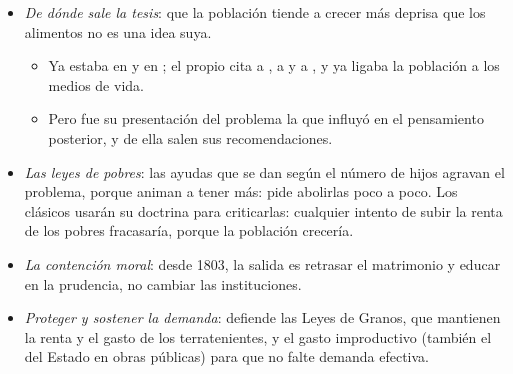 \documentclass[11pt]{article}
\begin{document}
\begin{itemize}
\item \emph{De dónde sale la tesis}: que la población tiende a crecer más deprisa que los alimentos no es una idea suya.
  \begin{itemize}
  \item Ya estaba en  y en \nocite{LandrethColander2006Historia}; el propio  cita a , a  y a \nocite{Malthus1798Essay}, y ya \textcite{Cantillon1755Essai} ligaba la población a los medios de vida.
  \item Pero fue su presentación del problema la que influyó en el pensamiento posterior, y de ella salen sus recomendaciones.
  \end{itemize}
\item \emph{Las leyes de pobres}: las ayudas que se dan según el número de hijos agravan el problema, porque animan a tener más:  pide abolirlas poco a poco. Los clásicos usarán su doctrina para criticarlas: cualquier intento de subir la renta de los pobres fracasaría, porque la población crecería.
\item \emph{La contención moral}: desde 1803, la salida es retrasar el matrimonio y educar en la prudencia, no cambiar las instituciones.
\item \emph{Proteger y sostener la demanda}: defiende las Leyes de Granos, que mantienen la renta y el gasto de los terratenientes, y el gasto improductivo (también el del Estado en obras públicas) para que no falte demanda efectiva.
\end{itemize}
\end{document}
